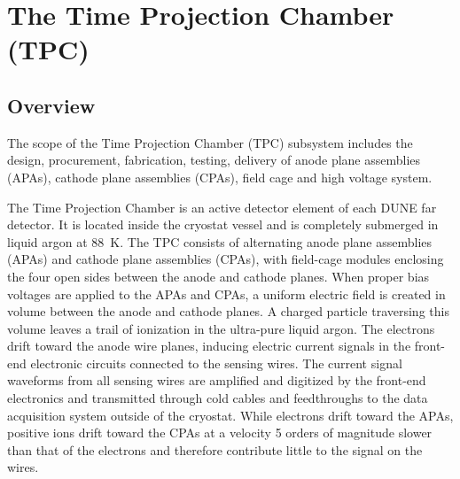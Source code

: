 
\section{The Time Projection Chamber (TPC)} 
\label{sec:detectors-fd-ref-tpc}

\subsection{Overview}

The scope of the Time Projection Chamber (TPC) subsystem includes the
design, procurement, fabrication, testing, delivery of anode plane
assemblies (APAs), cathode plane assemblies (CPAs), field cage and
high voltage system.

The Time Projection Chamber is an active detector element of each DUNE
far detector. It is located inside the cryostat vessel and is
completely submerged in liquid argon at 88~K. The TPC consists of
alternating anode plane assemblies (APAs) and cathode plane assemblies
(CPAs), with field-cage modules enclosing the four open sides between
the anode and cathode planes.  When proper bias voltages are applied
to the APAs and CPAs, a uniform electric field is created in volume
between the anode and cathode planes. A charged particle traversing
this volume leaves a trail of ionization in the ultra-pure liquid
argon.  The electrons drift toward the anode wire planes, inducing
electric current signals in the front-end electronic circuits
connected to the sensing wires.  The current signal waveforms from all
sensing wires are amplified and digitized by the front-end electronics
and transmitted through cold cables and feedthroughs to the data
acquisition system outside of the cryostat. While electrons drift
toward the APAs, positive ions drift toward the CPAs at a velocity 5 orders of magnitude slower than that of the electrons and therefore contribute little to the signal on the wires.  



